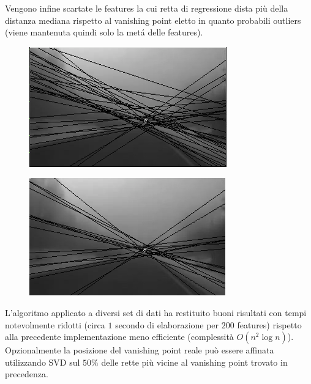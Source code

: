 \documentclass[12pt]{report}
\begin{document}
\noindent Vengono infine scartate le features la cui retta di regressione dista pi\`u della distanza mediana rispetto al vanishing point eletto in quanto probabili outliers (viene mantenuta quindi solo la met\'a delle features).

\begin{figure}
	\begin{minipage}[b]{0.5\linewidth}
		\centering
		\includegraphics[scale=0.6]{images/iaasBefore.png}
		\label{fig:vpBef}
	\end{minipage}
	\hspace{0.5cm}
	\begin{minipage}[b]{0.5\linewidth}
		\centering
		\includegraphics[scale=0.6]{images/iaasAfter.png}
		\label{fig:vpAft}
	\end{minipage}
\end{figure}

\noindent L'algoritmo applicato a diversi set di dati ha restituito buoni risultati con tempi notevolmente ridotti (circa $1$ secondo di elaborazione per $200$ features) rispetto alla precedente implementazione meno efficiente (complessit\`a $O\left(n^2\log{n}\right)$).\\

\noindent Opzionalmente la posizione del vanishing point reale pu\`o essere affinata utilizzando SVD sul $50\%$ delle rette pi\`u vicine al vanishing point trovato in precedenza.\\
\end{document}
